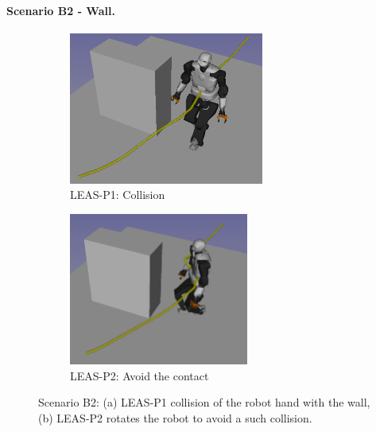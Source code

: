 
\paragraph{Scenario B2 - Wall.}
\begin{figure}[t]
    \captionsetup[subfigure]{justification=centering}
    \centering
    \begin{subfigure}[t]{0.48\linewidth}
        \includegraphics[width=\textwidth, height=5cm]{Figures/Chapter_CPSB/avoid_wall_fail.png}
        \caption{LEAS-P1: Collision\label{fig:cp-sb:talos_wall_collision}}
    \end{subfigure}
    \begin{subfigure}[t]{0.48\linewidth}
        \includegraphics[width=\textwidth, height=5cm]{Figures/Chapter_CPSB/avoid_wall.png}
        \caption{LEAS-P2: Avoid the contact\label{fig:cp-sb:talos_wall_ok}}
    \end{subfigure}
    \caption{Scenario B2: (a) LEAS-P1 collision of the robot hand with the wall, (b) LEAS-P2 rotates the robot to avoid a such collision.}
    \label{fig:cp-sb:talos_wall}
\end{figure}

